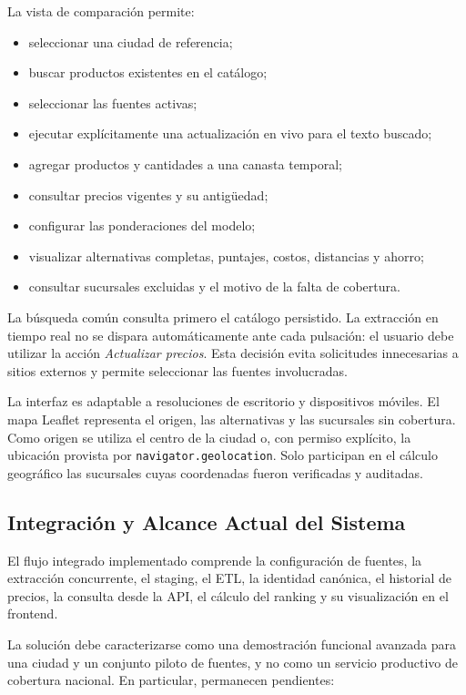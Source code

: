 La vista de comparación permite:

\begin{itemize}
    \item seleccionar una ciudad de referencia;
    \item buscar productos existentes en el catálogo;
    \item seleccionar las fuentes activas;
    \item ejecutar explícitamente una actualización en vivo para el texto
    buscado;
    \item agregar productos y cantidades a una canasta temporal;
    \item consultar precios vigentes y su antigüedad;
    \item configurar las ponderaciones del modelo;
    \item visualizar alternativas completas, puntajes, costos, distancias y
    ahorro;
    \item consultar sucursales excluidas y el motivo de la falta de cobertura.
\end{itemize}

La búsqueda común consulta primero el catálogo persistido. La extracción en
tiempo real no se dispara automáticamente ante cada pulsación: el usuario debe
utilizar la acción \textit{Actualizar precios}. Esta decisión evita solicitudes
innecesarias a sitios externos y permite seleccionar las fuentes involucradas.

La interfaz es adaptable a resoluciones de escritorio y dispositivos móviles.
El mapa Leaflet representa el origen, las alternativas y las sucursales sin
cobertura. Como origen se utiliza el centro de la ciudad o, con permiso explícito,
la ubicación provista por \texttt{navigator.geolocation}. Solo participan en el
cálculo geográfico las sucursales cuyas coordenadas fueron verificadas y auditadas.

\subsection{Integración y Alcance Actual del Sistema}

El flujo integrado implementado comprende la configuración de fuentes, la
extracción concurrente, el staging, el ETL, la identidad canónica, el historial
de precios, la consulta desde la API, el cálculo del ranking y su visualización
en el frontend.

La solución debe caracterizarse como una demostración funcional avanzada para
una ciudad y un conjunto piloto de fuentes, y no como un servicio productivo de
cobertura nacional. En particular, permanecen pendientes:

